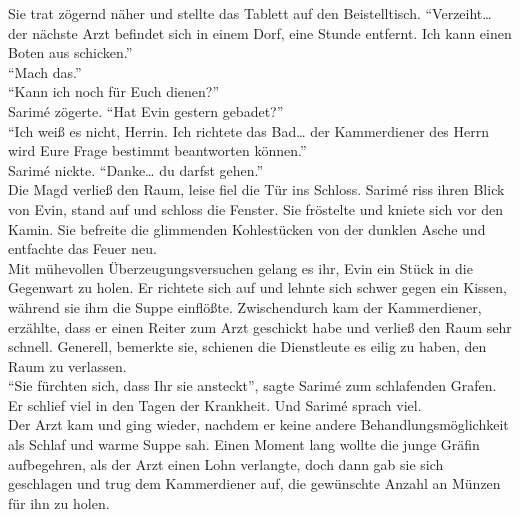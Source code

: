 Sie trat zögernd näher und stellte das Tablett auf den Beistelltisch. ``Verzeiht… der nächste Arzt 
befindet sich in einem Dorf, eine Stunde entfernt. Ich kann einen Boten aus schicken.''\\
``Mach das.''\\
``Kann ich noch für Euch dienen?''\\
Sarimé zögerte. ``Hat Evin gestern gebadet?''\\
``Ich weiß es nicht, Herrin. Ich richtete das Bad… der Kammerdiener des Herrn wird Eure Frage 
bestimmt beantworten können.''\\
Sarimé nickte. ``Danke… du darfst gehen.''\\
Die Magd verließ den Raum, leise fiel die Tür ins Schloss. Sarimé riss ihren Blick von Evin, stand 
auf und schloss die Fenster. Sie fröstelte und kniete sich vor den Kamin. Sie befreite die 
glimmenden Kohlestücken von der dunklen Asche und entfachte das Feuer neu. \\
Mit mühevollen Überzeugungsversuchen gelang es ihr, Evin ein Stück in die Gegenwart zu holen. Er 
richtete sich auf und lehnte sich schwer gegen ein Kissen, während sie ihm die Suppe einflößte. 
Zwischendurch kam der Kammerdiener, erzählte, dass er einen Reiter zum Arzt geschickt habe und 
verließ den Raum sehr schnell. Generell, bemerkte sie, schienen die Dienstleute es eilig zu haben, 
den Raum zu verlassen. \\
``Sie fürchten sich, dass Ihr sie ansteckt'', sagte Sarimé zum schlafenden Grafen. Er schlief viel 
in 
den Tagen der Krankheit. Und Sarimé sprach viel. \\
Der Arzt kam und ging wieder, nachdem er keine andere Behandlungsmöglichkeit als Schlaf und warme 
Suppe sah. Einen Moment lang wollte die junge Gräfin aufbegehren, als der Arzt einen Lohn 
verlangte, 
doch dann gab sie sich geschlagen und trug dem Kammerdiener auf, die gewünschte Anzahl an Münzen 
für 
ihn zu holen. \\

